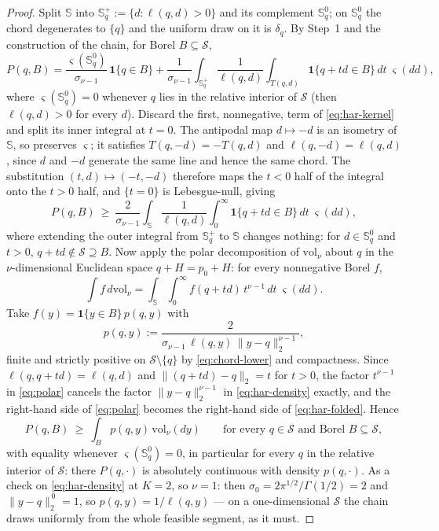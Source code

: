 \documentclass[11pt]{article}
\theoremstyle{plain}
\theoremstyle{definition}
\theoremstyle{remark}
\newcommand{\cS}{\mathcal{S}}
\begin{document}
\begin{proof}
Split $\mathbb S$ into $\mathbb S_q^+:=\{d:\ell(q,d)>0\}$ and its complement
$\mathbb S_q^0$; on $\mathbb S_q^0$ the chord degenerates to $\{q\}$ and the uniform draw
on it is $\delta_q$. By Step~1 and the construction of the chain, for Borel
$B\subseteq\cS$,
\begin{equation}\label{eq:har-kernel}
    P(q,B) = \frac{\varsigma(\mathbb S_q^0)}{\sigma_{\nu-1}}\,\mathbf1\{q\in B\}
    + \frac{1}{\sigma_{\nu-1}}\int_{\mathbb S_q^+}\frac{1}{\ell(q,d)}
      \int_{T(q,d)}\mathbf1\{q+td\in B\}\,dt\ \varsigma(dd),
\end{equation}
where $\varsigma(\mathbb S_q^0)=0$ whenever $q$ lies in the relative interior of $\cS$
(then $\ell(q,d)>0$ for every $d$). Discard the first, nonnegative, term of
\eqref{eq:har-kernel} and split its inner integral at $t=0$. The antipodal map
$d\mapsto-d$ is an isometry of $\mathbb S$, so
preserves $\varsigma$; it satisfies $T(q,-d)=-T(q,d)$ and $\ell(q,-d)=\ell(q,d)$, since
$d$ and $-d$ generate the same line and hence the same chord. The substitution
$(t,d)\mapsto(-t,-d)$ therefore maps the $t<0$ half of the integral onto the $t>0$ half,
and $\{t=0\}$ is Lebesgue-null, giving
\begin{equation}\label{eq:har-folded}
    P(q,B)\ \ge\ \frac{2}{\sigma_{\nu-1}}\int_{\mathbb S}\frac{1}{\ell(q,d)}
    \int_0^\infty\mathbf1\{q+td\in B\}\,dt\ \varsigma(dd),
\end{equation}
where extending the outer integral from $\mathbb S_q^+$ to $\mathbb S$ changes nothing:
for $d\in\mathbb S_q^0$ and $t>0$, $q+td\notin\cS\supseteq B$. Now apply the polar
decomposition of $\mathrm{vol}_\nu$ about $q$ in the $\nu$-dimensional Euclidean space
$q+H=p_0+H$: for every nonnegative Borel $f$,
\begin{equation}\label{eq:polar}
    \int f\,d\mathrm{vol}_\nu
    = \int_{\mathbb S}\int_0^\infty f(q+td)\,t^{\nu-1}\,dt\ \varsigma(dd).
\end{equation}
Take $f(y)=\mathbf1\{y\in B\}\,p(q,y)$ with
\begin{equation}\label{eq:har-density}
    p(q,y) := \frac{2}{\sigma_{\nu-1}\,\ell(q,y)\,\|y-q\|_2^{\nu-1}},
\end{equation}
finite and strictly positive on $\cS\setminus\{q\}$ by \eqref{eq:chord-lower} and
compactness. Since $\ell(q,q+td)=\ell(q,d)$ and $\|(q+td)-q\|_2=t$ for $t>0$, the factor
$t^{\nu-1}$ in \eqref{eq:polar} cancels the factor $\|y-q\|_2^{\nu-1}$ in
\eqref{eq:har-density} exactly, and the right-hand side of \eqref{eq:polar} becomes the
right-hand side of \eqref{eq:har-folded}. Hence
\begin{equation}\label{eq:har-density-bound}
    P(q,B)\ \ge\ \int_B p(q,y)\,\mathrm{vol}_\nu(dy)
    \qquad\text{for every }q\in\cS\text{ and Borel }B\subseteq\cS,
\end{equation}
with equality whenever $\varsigma(\mathbb S_q^0)=0$, in particular for every $q$ in the
relative interior of $\cS$: there $P(q,\cdot)$ is absolutely continuous with density
$p(q,\cdot)$. As a check on \eqref{eq:har-density} at $K=2$, so $\nu=1$: then
$\sigma_0=2\pi^{1/2}/\Gamma(1/2)=2$ and $\|y-q\|_2^{\,0}=1$, so $p(q,y)=1/\ell(q,y)$ ---
on a one-dimensional $\cS$ the chain draws uniformly from the whole feasible segment, as
it must.


\end{proof}
\end{document}
